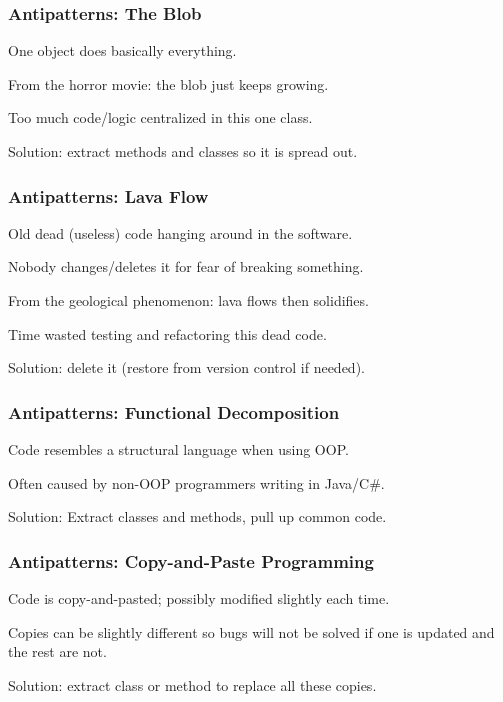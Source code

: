\begin{frame}
\frametitle{Antipatterns: The Blob}
\begin{changemargin}{1cm}
One object does basically everything.

From the horror movie: the blob just keeps growing.

Too much code/logic centralized in this one class.

Solution: extract methods and classes so it is spread out.


\end{changemargin}
\end{frame}

\begin{frame}
\frametitle{Antipatterns: Lava Flow}
\begin{changemargin}{1cm}
Old dead (useless) code hanging around in the software.

Nobody changes/deletes it for fear of breaking something.

From the geological phenomenon: lava flows then solidifies.

Time wasted testing and refactoring this dead code.

Solution: delete it (restore from version control if needed).

\end{changemargin}
\end{frame}

\begin{frame}
\frametitle{Antipatterns: Functional Decomposition}
\begin{changemargin}{1cm}
Code resembles a structural language when using OOP.

Often caused by non-OOP programmers writing in Java/C\#.

Solution: Extract classes and methods, pull up common code.

\end{changemargin}
\end{frame}

\begin{frame}
\frametitle{Antipatterns: Copy-and-Paste Programming}
\begin{changemargin}{1cm}
Code is copy-and-pasted; possibly modified slightly each time.

Copies can be slightly different so bugs will not be solved if one is updated and the rest are not.

Solution: extract class or method to replace all these copies.

\end{changemargin}
\end{frame}

